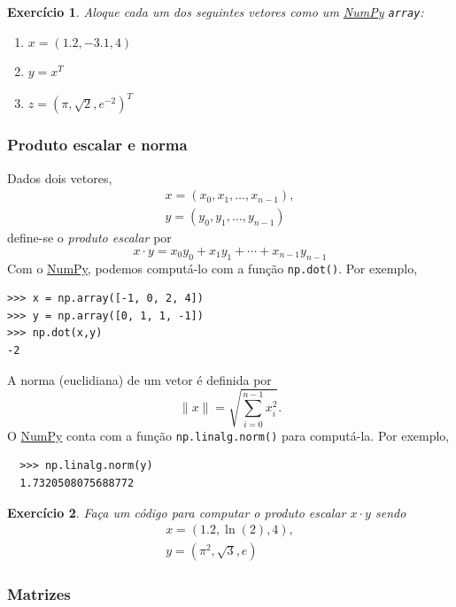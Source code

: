\documentclass[12pt]{article}
\newtheorem{exr}{Exercício}[section]
\begin{document}
\begin{exr}
  Aloque cada um dos seguintes vetores como um \href{https://numpy.org/}{NumPy} \lstinline+array+:
  \begin{enumerate}
  \item[a)] $x = (1.2, -3.1, 4)$
  \item[b)] $y = x^T$
  \item[c)] $z = (\pi, \sqrt{2}, e^{-2})^T$
  \end{enumerate}
\end{exr}

\subsubsection{Produto escalar e norma}

Dados dois vetores,
\begin{gather}
  x = (x_0, x_1, \dotsc, x_{n-1}),\\
  y = (y_0, y_1, \dotsc, y_{n-1})
\end{gather}
define-se o \emph{produto escalar} por
\begin{equation}
  x\cdot y = x_0y_0 + x_1y_1 + \cdots + x_{n-1}y_{n-1}
\end{equation}
Com o \href{https://numpy.org/}{NumPy}, podemos computá-lo com a função \lstinline+np.dot()+. Por exemplo,
\begin{lstlisting}
>>> x = np.array([-1, 0, 2, 4])
>>> y = np.array([0, 1, 1, -1])
>>> np.dot(x,y)
-2
\end{lstlisting}

A norma (euclidiana) de um vetor é definida por
\begin{equation}
  \|x\| = \sqrt{\sum_{i=0}^{n-1} x_i^2}.
\end{equation}
O \href{https://numpy.org/}{NumPy} conta com a função \lstinline+np.linalg.norm()+ para computá-la. Por exemplo,
\begin{lstlisting}
  >>> np.linalg.norm(y)
  1.7320508075688772
\end{lstlisting}

\begin{exr}
  Faça um código para computar o produto escalar $x\cdot y$ sendo
  \begin{gather}
    x = (1.2, \ln(2), 4),\\
    y = (\pi^2, \sqrt{3}, e)
  \end{gather}
\end{exr}


\subsubsection{Matrizes}
\end{document}

